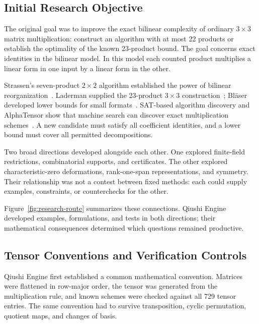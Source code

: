 \subsection{Initial Research Objective}\label{route:problem}

The original goal was to improve the exact bilinear complexity of ordinary
$3\times3$ matrix multiplication: construct an algorithm with at most
22 products or establish the optimality of the known 23-product bound.
The goal concerns exact identities in the bilinear model. In this model
each counted product multiplies a linear form in one input by a linear
form in the other.

Strassen's seven-product $2\times2$ algorithm established the power of
bilinear reorganization~\cite{strassen1969gaussian}. Laderman supplied the
23-product $3\times3$ construction~\cite{laderman1976noncommutative};
Bl\"aser developed lower bounds for small
formats~\cite{blaser2003}. SAT-based algorithm discovery and AlphaTensor
show that machine search can discover exact multiplication
schemes~\cite{heule2019waysa,alphatensor2022}. A new candidate must satisfy all coefficient
identities, and a lower bound must cover all permitted decompositions.

Two broad directions developed alongside each other. One explored
finite-field restrictions, combinatorial supports, and certificates.
The other explored characteristic-zero deformations, rank-one-span
representations, and symmetry. Their relationship was not a contest
between fixed methods: each could supply examples, constraints, or
counterchecks for the other.

Figure~\ref{fig:research-route} summarizes these connections. Qiushi Engine
developed examples, formulations, and tests in both directions; their
mathematical consequences determined which questions remained productive.

\subsection{Tensor Conventions and Verification Controls}\label{route:controls}

Qiushi Engine first established a common mathematical convention.
Matrices were flattened in row-major order, the tensor was generated
from the multiplication rule, and known schemes were checked against
all 729 tensor entries. The same convention had to survive transposition,
cyclic permutation, quotient maps, and changes of basis.

